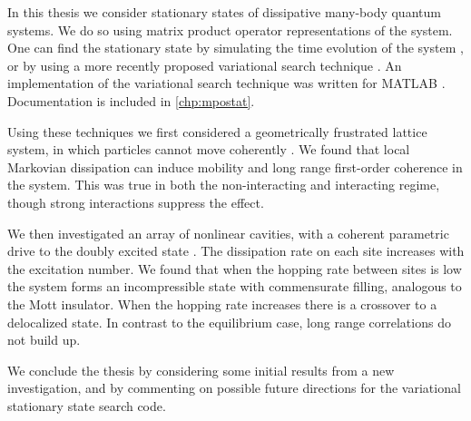 In this thesis we consider stationary states of dissipative many-body quantum systems. We do so using matrix product operator representations of the system. One can find the stationary state by simulating the time evolution of the system \cite{Vidal2004,Schollwock2011}, or by using a more recently proposed variational search technique \cite{Cui2015,Mascarenhas2015}. An implementation of the variational search technique was written for MATLAB \cite{otb:gitVSSS,MATLAB}. Documentation is included in \cref{chp:mpostat}.

Using these techniques we first considered a geometrically frustrated lattice system, in which particles cannot move coherently \cite{Owen2017}. We found that local Markovian dissipation can induce mobility and long range first-order coherence in the system. This was true in both the non-interacting and interacting regime, though strong interactions suppress the effect.

We then investigated an array of nonlinear cavities, with a coherent parametric drive to the doubly excited state \cite{Brown2018}. The dissipation rate on each site increases with the excitation number. We found that when the hopping rate between sites is low the system forms an incompressible state with commensurate filling, analogous to the Mott insulator. When the hopping rate increases there is a crossover to a delocalized state. In contrast to the equilibrium case, long range correlations do not build up.

We conclude the thesis by considering some initial results from a new investigation, and by commenting on possible future directions for the variational stationary state search code.